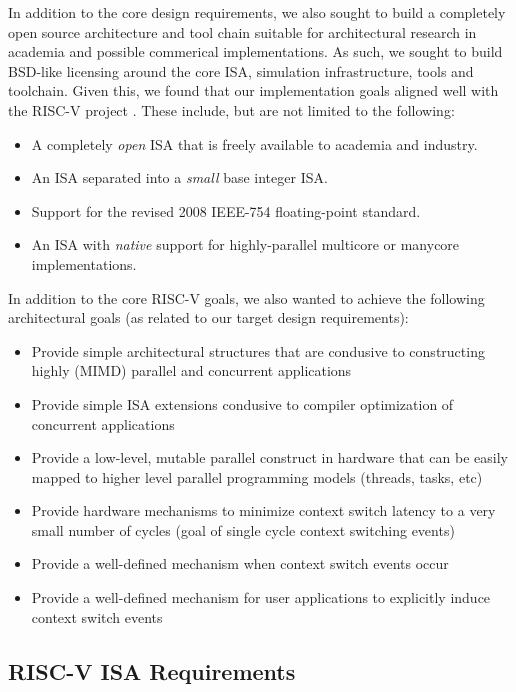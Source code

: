 \documentclass{article}
\begin{document}
In addition to the core design requirements, we also sought to build a
completely open source architecture and tool chain suitable for architectural 
research in academia and possible commerical implementations.  As such, we sought
to build BSD-like licensing around the core ISA, simulation infrastructure, tools
and toolchain.  Given this, we found that our implementation goals aligned 
well with the RISC-V project \cite{Waterman:EECS-2014-54}.  These include, but are
not limited to the following: 

\begin{itemize}
\item A completely \emph{open} ISA that is freely available to academia and industry.
\item An ISA separated into a \emph{small} base integer ISA. 
\item Support for the revised 2008 IEEE-754 \cite{2008IEEE} floating-point standard.
\item An ISA with \emph{native} support for highly-parallel multicore or manycore
implementations.  
\end{itemize}

In addition to the core RISC-V goals, we also wanted to achieve the following
architectural goals (as related to our target design requirements): 

\begin{itemize}
\item Provide simple architectural structures that are condusive to constructing
  highly (MIMD) parallel and concurrent applications
\item Provide simple ISA extensions condusive to compiler optimization of
concurrent applications
\item Provide a low-level, mutable parallel construct in hardware that can
  be easily mapped to higher level parallel programming models (threads, tasks, etc)
\item Provide hardware mechanisms to minimize context switch latency to a very small
  number of cycles (goal of single cycle context switching events)
\item Provide a well-defined mechanism when context switch events occur
\item Provide a well-defined mechanism for user applications to explicitly induce
  context switch events
\end{itemize}

\subsection{RISC-V ISA Requirements}
\end{document}
